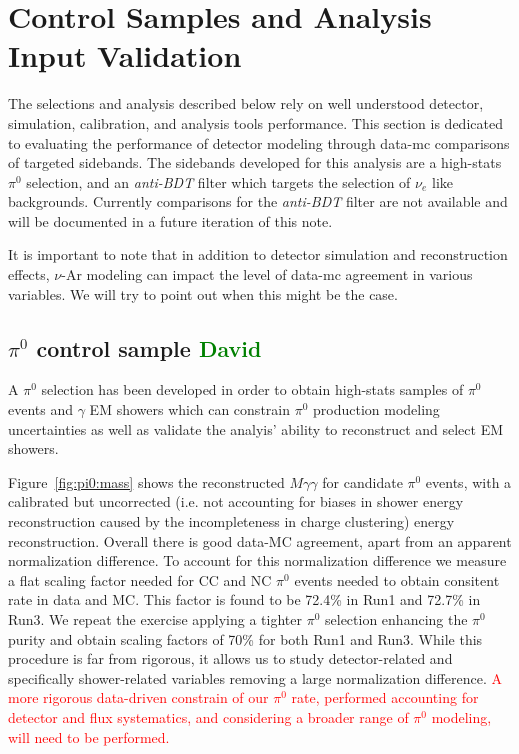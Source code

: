\documentclass[a4paper]{article}
\begin{document}
\newpage

\section{Control Samples and Analysis Input Validation}
\label{sec:controls}
\par The selections and analysis described below rely on well understood detector, simulation, calibration, and analysis tools performance. This section is dedicated to evaluating the performance of detector modeling through data-mc comparisons of targeted sidebands. The sidebands developed for this analysis are a high-stats $\pi^0$ selection, and an \emph{anti-BDT} filter which targets the selection of $\nu_e$ like backgrounds. Currently comparisons for the \emph{anti-BDT} filter are not available and will be documented in a future iteration of this note.
\par It is important to note that in addition to detector simulation and reconstruction effects, $\nu$-Ar modeling can impact the level of data-mc agreement in various variables. We will try to point out when this might be the case.
\subsection{$\pi^0$ control sample \textcolor{green}{David}}
\label{sec:controls:pi0}
\par A $\pi^0$ selection has been developed in order to obtain high-stats samples of $\pi^0$ events and $\gamma$ EM showers which can constrain $\pi^0$ production modeling uncertainties as well as validate the analyis' ability to reconstruct and select EM showers.
\par Figure~\ref{fig:pi0:mass} shows the reconstructed $M\gamma\gamma$ for candidate $\pi^0$ events, with a calibrated but uncorrected (i.e. not accounting for biases in shower energy reconstruction caused by the incompleteness in charge clustering) energy reconstruction. Overall there is good data-MC agreement, apart from an apparent normalization difference. To account for this normalization difference we measure a flat scaling factor needed for CC and NC $\pi^0$ events needed to obtain  consitent rate in data and MC. This factor is found to be 72.4\% in Run1 and 72.7\% in Run3. We repeat the exercise applying a tighter $\pi^0$ selection enhancing the $\pi^0$ purity and obtain scaling factors of 70\% for both Run1 and Run3. While this procedure is far from rigorous, it allows us to study detector-related and specifically shower-related variables removing a large normalization difference. \textcolor{red}{A more rigorous data-driven constrain of our $\pi^0$ rate, performed accounting for detector and flux systematics, and considering a broader range of $\pi^0$ modeling, will need to be performed.}
\end{document}
